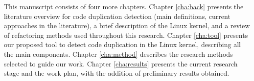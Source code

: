 This manuscript consists of four more chapters.
Chapter \ref{cha:back} presents the literature overview for code duplication detection (main definitions, 
current approaches in the literature), a brief description of the Linux kernel, and a review of refactoring methods 
used throughout this research.
Chapter \ref{cha:tool} presents our proposed tool to detect code duplication in the Linux kernel, describing all 
the main components.
Chapter \ref{cha:method} describes the research methods selected to guide our work.
Chapter \ref{cha:results} presents the current research stage and the work plan, with the addition of 
preliminary results obtained.
